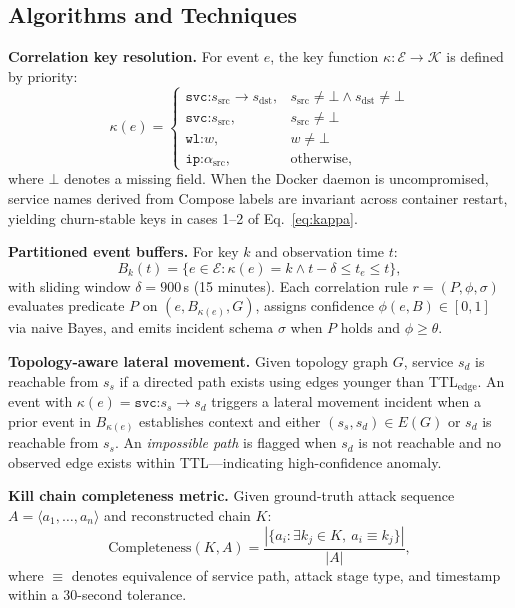 \documentclass[conference]{IEEEtran}
\begin{document}
\subsection{Algorithms and Techniques}

\textbf{Correlation key resolution.}
For event $e$, the key function $\kappa: \mathcal{E} \rightarrow \mathcal{K}$
is defined by priority:
\begin{equation}
\kappa(e)=
\begin{cases}
\texttt{svc:}s_{\text{src}}\!\rightarrow\!s_{\text{dst}}, &
s_{\text{src}}\!\neq\!\bot \land s_{\text{dst}}\!\neq\!\bot \\
\texttt{svc:}s_{\text{src}}, & s_{\text{src}}\!\neq\!\bot \\
\texttt{wl:}w, & w\!\neq\!\bot \\
\texttt{ip:}\alpha_{\text{src}}, & \text{otherwise},
\end{cases}
\label{eq:kappa}
\end{equation}
where $\bot$ denotes a missing field. When the Docker daemon is
uncompromised, service names derived from Compose labels are invariant
across container restart, yielding churn-stable keys in cases 1--2 of
Eq.~\eqref{eq:kappa}.

\textbf{Partitioned event buffers.}
For key $k$ and observation time $t$:
\begin{equation}
B_k(t)=\{e \in \mathcal{E} : \kappa(e)=k \land t-\delta \leq t_e \leq t\},
\label{eq:buffer}
\end{equation}
with sliding window $\delta=900$\,s (15 minutes). Each correlation rule
$r=(P,\phi,\sigma)$ evaluates predicate $P$ on $(e, B_{\kappa(e)}, G)$,
assigns confidence $\phi(e,B)\in[0,1]$ via naive Bayes, and emits incident
schema $\sigma$ when $P$ holds and $\phi \geq \theta$.

\textbf{Topology-aware lateral movement.}
Given topology graph $G$, service $s_d$ is reachable from $s_s$ if a directed
path exists using edges younger than TTL$_{\text{edge}}$. An event with
$\kappa(e)=\texttt{svc:}s_s\!\rightarrow\!s_d$ triggers a lateral movement
incident when a prior event in $B_{\kappa(e)}$ establishes context and
either $(s_s,s_d)\in E(G)$ or $s_d$ is reachable from $s_s$. An
\emph{impossible path} is flagged when $s_d$ is not reachable and no
observed edge exists within TTL---indicating high-confidence anomaly.

\textbf{Kill chain completeness metric.}
Given ground-truth attack sequence $A=\langle a_1,\ldots,a_n\rangle$ and
reconstructed chain $K$:
\begin{equation}
\text{Completeness}(K,A)=
\frac{|\{a_i : \exists k_j \in K,\ a_i \equiv k_j\}|}{|A|},
\label{eq:completeness}
\end{equation}
where $\equiv$ denotes equivalence of service path, attack stage type, and
timestamp within a 30-second tolerance.
\end{document}
